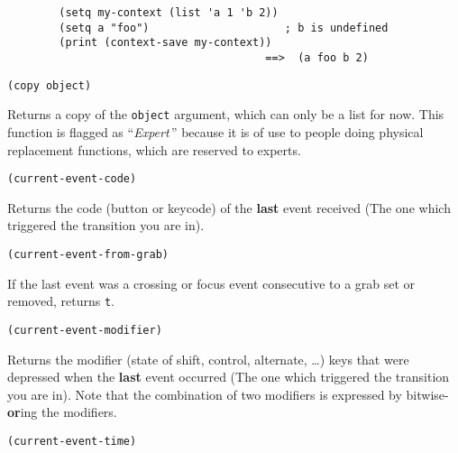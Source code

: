 {\exemplefont\begin{verbatim}
        (setq my-context (list 'a 1 'b 2))
        (setq a "foo")                     ; b is undefined
        (print (context-save my-context))
                                        ==>  (a foo b 2)
\end{verbatim}}


{\usagefont\begin{verbatim}
(copy object)
\end{verbatim}}\usageupspace

Returns a copy of the \verb"object" argument, which can only be a list for
now. This function is flagged as ``{\em Expert}\,'' because it is of use
to people doing physical replacement functions, which are reserved to
experts.

        
{\usagefont\begin{verbatim}
(current-event-code)
\end{verbatim}}\usageupspace

Returns the code (button or keycode) of the {\bf last} event received (The
one which triggered the transition you are in).

        
{\usagefont\begin{verbatim}
(current-event-from-grab)
\end{verbatim}}\usageupspace

If the last event was a crossing or focus event consecutive to a grab set or
removed, returns \verb"t".

        
{\usagefont\begin{verbatim}
(current-event-modifier)
\end{verbatim}}\usageupspace

Returns the modifier (state of shift, control, alternate, \ldots ) keys that were
depressed when the {\bf last} event occurred (The one which triggered the
transition you are in).  Note that the combination of two modifiers is
expressed by bitwise-{\bf or}ing the modifiers.


{\usagefont\begin{verbatim}
(current-event-time)
\end{verbatim}}\usageupspace

